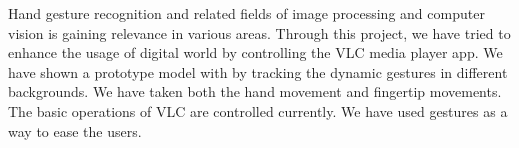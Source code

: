 \documentclass[a4paper,11pt]{article}
\begin{document}
		Hand gesture recognition and related fields of image processing and computer vision is gaining relevance in various areas. Through this project, we have tried to enhance the usage of digital world by controlling the VLC media player app. We have shown a prototype model with by tracking the dynamic gestures in different backgrounds. We have taken both the hand movement and fingertip movements. The basic operations of VLC are controlled currently. We have used gestures as a way to ease the users. 





	\newpage
	\nocite{*}
	
	
\end{document}
